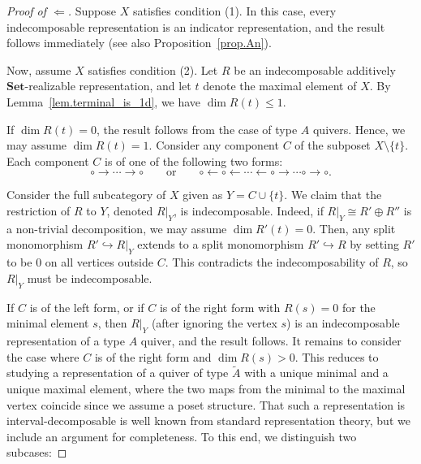 \documentclass[a4paper]{amsart}
\theoremstyle{plain}
\theoremstyle{definition}
\theoremstyle{remark}
\newcommand{\Set}{\mathbf{Set}}
\begin{document}
\begin{proof}[Proof of \( \Leftarrow \)]
Suppose $X$ satisfies condition (1). In this case, every indecomposable representation is an indicator representation, and the result follows immediately (see also Proposition~\ref{prop.An}). 

Now, assume $X$ satisfies condition (2). Let $R$ be an indecomposable additively $\Set$-realizable representation, and let $t$ denote the maximal element of $X$. By Lemma~\ref{lem.terminal_is_1d}, we have $\dim R(t) \leq 1$. 

If $\dim R(t) = 0$, the result follows from the case of type $A$ quivers. Hence, we may assume $\dim R(t) = 1$. Consider any component \( C \) of the subposet \( X \setminus \{ t \} \). Each component $C$ is of one of the following two forms:
\[
\circ \to \cdots \to \circ \qquad \text{or} \qquad \circ \leftarrow \circ \leftarrow \cdots \leftarrow \circ \rightarrow \cdots \circ \rightarrow \circ.
\]

Consider the full subcategory of $X$ given as $Y = C \cup \{ t \}$. We claim that the restriction of $R$ to $Y$, denoted $R|_Y$, is indecomposable. Indeed, if $R|_Y \cong R' \oplus R''$ is a non-trivial decomposition, we may assume $\dim R'(t) = 0$. Then, any split monomorphism $R' \hookrightarrow R|_Y$ extends to a split monomorphism $R' \hookrightarrow R$ by setting $R'$ to be $0$ on all vertices outside $C$. This contradicts the indecomposability of $R$, so $R|_Y$ must be indecomposable.

If $C$ is of the left form, or if $C$ is of the right form with $R(s) = 0$ for the minimal element $s$, then $R|_Y$ (after ignoring the vertex $s$) is an indecomposable representation of a type $A$ quiver, and the result follows. It remains to consider the case where $C$ is of the right form and $\dim R(s) > 0$. This reduces to studying a representation of a quiver of type $\tilde{A}$ with a unique minimal and a unique maximal element, where the two maps from the minimal to the maximal vertex coincide since we assume a poset structure. That such a representation is interval-decomposable is well known from standard representation theory, but we include an argument for completeness. To this end, we distinguish two subcases:


\end{proof}
\end{document}
